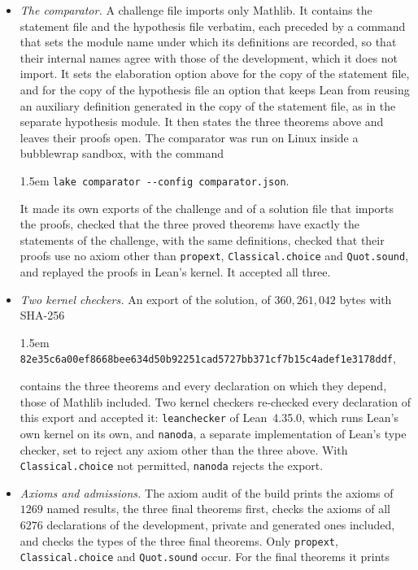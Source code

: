 \begin{itemize}
\item \emph{The comparator.} A challenge file imports only Mathlib. It contains the statement file and the hypothesis file verbatim, each preceded by a command that sets the module name under which its definitions are recorded, so that their internal names agree with those of the development, which it does not import. It sets the elaboration option above for the copy of the statement file, and for the copy of the hypothesis file an option that keeps Lean from reusing an auxiliary definition generated in the copy of the statement file, as in the separate hypothesis module. It then states the three theorems above and leaves their proofs open. The comparator was run on Linux inside a bubblewrap sandbox, with the command
\begin{flushleft}\small\leftskip1.5em
\texttt{lake comparator -{}-config comparator.json}.
\end{flushleft}
It made its own exports of the challenge and of a solution file that imports the proofs, checked that the three proved theorems have exactly the statements of the challenge, with the same definitions, checked that their proofs use no axiom other than \texttt{propext}, \texttt{Classical.choice} and \texttt{Quot.sound}, and replayed the proofs in Lean's kernel. It accepted all three.
\item \emph{Two kernel checkers.} An export of the solution, of $360{,}261{,}042$ bytes with SHA-256
\begin{flushleft}\small\leftskip1.5em
\nolinkurl{82e35c6a00ef8668bee634d50b92251cad5727bb371cf7b15c4adef1e3178ddf},
\end{flushleft}
contains the three theorems and every declaration on which they depend, those of Mathlib included. Two kernel checkers re-checked every declaration of this export and accepted it: \texttt{leanchecker} of Lean~4.35.0, which runs Lean's own kernel on its own, and \texttt{nanoda}, a separate implementation of Lean's type checker, set to reject any axiom other than the three above. With \texttt{Classical.choice} not permitted, \texttt{nanoda} rejects the export.
\item \emph{Axioms and admissions.} The axiom audit of the build prints the axioms of $1269$ named results, the three final theorems first, checks the axioms of all $6276$ declarations of the development, private and generated ones included, and checks the types of the three final theorems. Only \texttt{propext}, \texttt{Classical.choice} and \texttt{Quot.sound} occur. For the final theorems it prints

\end{itemize}
